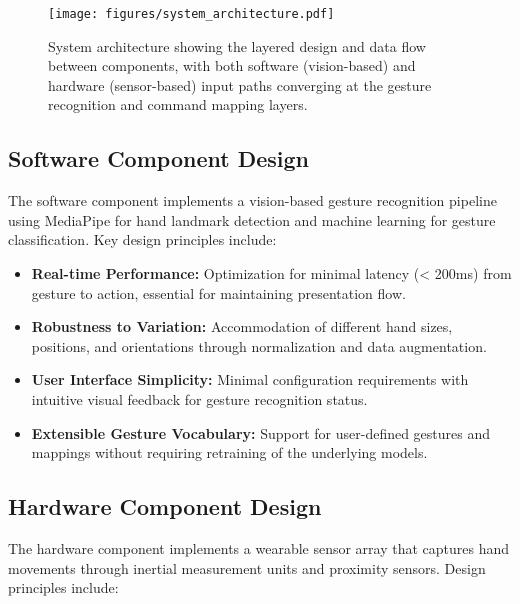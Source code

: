 \documentclass[arxiv,usenatbib]{iupartex}
\begin{document}
\begin{figure}
    \begin{center}
        \label{fig1}
        \texttt{[image: figures/system\_architecture.pdf]}
        \caption{System architecture showing the layered design and data flow between components, with both software (vision-based) and hardware (sensor-based) input paths converging at the gesture recognition and command mapping layers.} 
    \end{center}
\end{figure}

\subsection{Software Component Design}
The software component implements a vision-based gesture recognition pipeline using MediaPipe for hand landmark detection and machine learning for gesture classification. Key design principles include:

\begin{itemize}
  \item \textbf{Real-time Performance:} Optimization for minimal latency (< 200ms) from gesture to action, essential for maintaining presentation flow.
  
  \item \textbf{Robustness to Variation:} Accommodation of different hand sizes, positions, and orientations through normalization and data augmentation.
  
  \item \textbf{User Interface Simplicity:} Minimal configuration requirements with intuitive visual feedback for gesture recognition status.
  
  \item \textbf{Extensible Gesture Vocabulary:} Support for user-defined gestures and mappings without requiring retraining of the underlying models.
\end{itemize}

\subsection{Hardware Component Design}
The hardware component implements a wearable sensor array that captures hand movements through inertial measurement units and proximity sensors. Design principles include:
\end{document}
